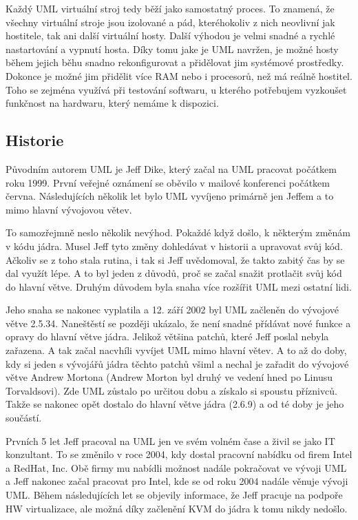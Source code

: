 Každý UML virtuální stroj tedy běží jako samostatný proces. To znamená, že všechny virtuální stroje jsou izolované a pád, kteréhokoliv z nich neovlivní jak hostitele, tak ani další virtuální hosty. Další výhodou je velmi snadné a rychlé nastartování a vypnutí hosta. Díky tomu jake je UML navržen, je možné hosty během jejich běhu snadno rekonfigurovat a přidělovat jim systémové prostředky. Dokonce je možné jim přidělit více RAM nebo i procesorů, než má reálně hostitel. Toho se zejména využívá při testování softwaru, u kterého potřebujem vyzkoušet funkčnost na hardwaru, který nemáme k dispozici.
\subsection{Historie}
Původním autorem UML je Jeff Dike, který začal na UML pracovat počátkem roku 1999. První veřejné oznámení se oběvilo v mailové konferenci počátkem června. Následujících několik let bylo UML vyvíjeno primárně jen Jeffem a to mimo hlavní vývojovou větev.

To samozřejmně neslo několik nevýhod. Pokaždé když došlo, k některým změnám v kódu jádra. Musel Jeff tyto změny dohledávat v historii a upravovat svůj kód. Ačkoliv se z toho stala rutina, i tak si Jeff uvědomoval, že takto zabitý čas by se dal využít lépe. A to byl jeden z důvodů, proč se začal snažit protlačit svůj kód do hlavní větve. Druhým důvodem byla snaha více rozšířit UML mezi ostatní lidi.

Jeho snaha se nakonec vyplatila a 12. září 2002 byl UML začleněn do vývojové větve 2.5.34. Naneštěstí se později ukázalo, že není snadné přídávat nové funkce a opravy do hlavní větve jádra. Jelikož většina patchů, které Jeff poslal nebyla zařazena. A tak začal nacvhíli vyvíjet UML mimo hlavní větev. A to až do doby, kdy si jeden s vývojářů jádra těchto patchů všiml a nechal je zařadit do vývojové větve Andrew Mortona (Andrew Morton byl druhý ve vedení hned po Linusu Torvaldsovi). Zde UML zůstalo po určitou dobu a získalo si spoustu příznivců. Takže se nakonec opět dostalo do hlavní větve jádra (2.6.9) a od té doby je jeho součástí.

Prvních 5 let Jeff pracoval na UML jen ve svém volném čase a živil se jako IT konzultant. To se změnilo v roce 2004, kdy dostal pracovní nabídku od firem Intel a RedHat, Inc. Obě firmy mu nabídli možnost nadále pokračovat ve vývoji UML a Jeff nakonec začal pracovat pro Intel, kde se od roku 2004 nadále věnuje vývoji UML. Během následujících let se objevily informace, že Jeff pracuje na podpoře HW virtualizace, ale možná díky začlenění KVM do jádra k tomu nikdy nedošlo. 

